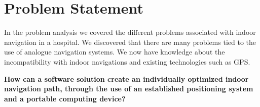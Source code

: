 \chapter{Problem Statement}



In the problem analysis we covered the different problems associated with indoor navigation in a hospital.
We discovered that there are many problems tied to the use of analogue navigation systems. We now have knowledge about the incompatibility with indoor navigations and existing technologies such as GPS.



\textbf{How can a software solution create an individually optimized indoor navigation path, through the use of an established positioning system and a portable computing device?}
